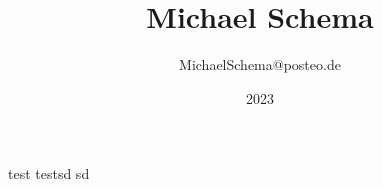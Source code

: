 \documentclass[11pt]{article}
\title{\bfseries\Huge Michael Schema}
\author{MichaelSchema@posteo.de}
\date{2023\-04}
\begin{document}
    \maketitle

test
testsd \newline
sd
\end{document}
